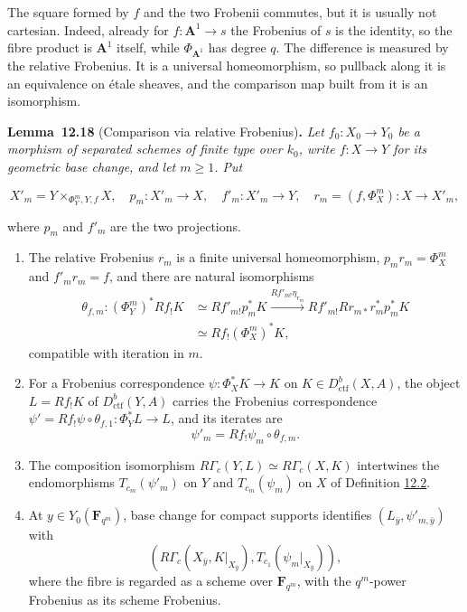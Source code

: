 \documentclass[11pt]{article}
\newenvironment{bpstatement}[2]{\par\addvspace{0.6\baselineskip}\noindent\textbf{#1}#2\textbf{.}\enspace\ignorespaces}
  {\par\addvspace{0.4\baselineskip}}
\newenvironment{bpstatementit}[2]{\begin{bpstatement}{#1}{#2}\itshape\ignorespaces}{\end{bpstatement}}
\begin{document}
The square formed by \(f\) and the two Frobenii commutes, but it is usually not cartesian. Indeed, already for \(f:\mathbf A^1\to s\) the Frobenius of \(s\) is the identity, so the fibre product is \(\mathbf A^1\) itself, while \(\Phi_{\mathbf A^1}\) has degree \(q\). The difference is measured by the relative Frobenius. It is a universal homeomorphism, so pullback along it is an equivalence on étale sheaves, and the comparison map built from it is an isomorphism.

\label{bp55}%
\begin{bpstatementit}{Lemma~12.18}{ (Comparison via relative Frobenius)}
Let \(f_0:X_0\to Y_0\) be a morphism of separated schemes of finite type over \(k_0\), write \(f:X\to Y\) for its geometric base change, and let \(m\geq1\). Put

\[
X'_m=Y\times_{\Phi_Y^m,Y,f}X,
\quad p_m:X'_m\to X,\quad f'_m:X'_m\to Y,
\quad r_m=(f,\Phi_X^m):X\to X'_m,
\]

where \(p_m\) and \(f'_m\) are the two projections.

\begin{enumerate}
\item The relative Frobenius \(r_m\) is a finite universal homeomorphism, \(p_mr_m=\Phi_X^m\) and \(f'_mr_m=f\), and there are natural isomorphisms \[
   \begin{aligned}
   \theta_{f,m}:(\Phi_Y^m)^*Rf_!K
   &\simeq Rf'_{m!}p_m^*K
   \xrightarrow{Rf'_{m!}\eta_{r_m}}
   Rf'_{m!}Rr_{m*}r_m^*p_m^*K\\
   &\simeq Rf_!(\Phi_X^m)^*K,
   \end{aligned}
   \] compatible with iteration in \(m\).
\item For a Frobenius correspondence \(\psi:\Phi_X^*K\to K\) on \(K\in D^b_{\mathrm{ctf}}(X,A)\), the object \(L=Rf_!K\) of \(D^b_{\mathrm{ctf}}(Y,A)\) carries the Frobenius correspondence \(\psi'=Rf_!\psi\circ\theta_{f,1}:\Phi_Y^*L\to L\), and its iterates are \[
   \psi'_m=Rf_!\psi_m\circ\theta_{f,m}.
   \]
\item The composition isomorphism \(R\Gamma_c(Y,L)\simeq R\Gamma_c(X,K)\) intertwines the endomorphisms \(T_{c_m}(\psi'_m)\) on \(Y\) and \(T_{c_m}(\psi_m)\) on \(X\) of Definition \hyperref[bp7]{12.2}.
\item At \(y\in Y_0(\mathbf F_{q^m})\), base change for compact supports identifies \((L_{\bar y},\psi'_{m,\bar y})\) with \[
   \left(R\Gamma_c(X_{\bar y},K|_{X_{\bar y}}),
   T_{c_1}(\psi_m|_{X_{\bar y}})\right),
   \] where the fibre is regarded as a scheme over \(\mathbf F_{q^m}\), with the \(q^m\)-power Frobenius as its scheme Frobenius.
\end{enumerate}
\end{bpstatementit}
\end{document}
